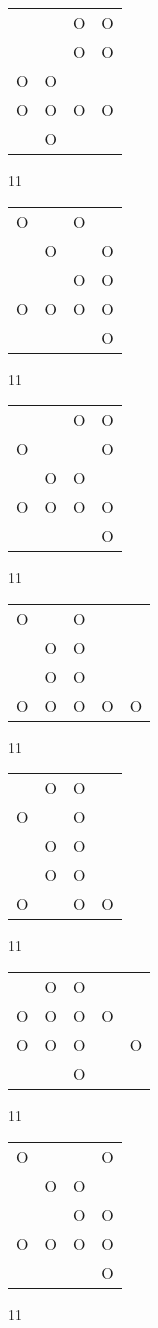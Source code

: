 \begin{tabular}{|m{0.2cm}m{0.2cm}m{0.2cm}m{0.2cm}|}\hline
 & &O&O\\
 & &O&O\\
O&O& & \\
O&O&O&O\\
 &O& & \\
\hline\end{tabular}11
\begin{tabular}{|m{0.2cm}m{0.2cm}m{0.2cm}m{0.2cm}|}\hline
O& &O& \\
 &O& &O\\
 & &O&O\\
O&O&O&O\\
 & & &O\\
\hline\end{tabular}11
\begin{tabular}{|m{0.2cm}m{0.2cm}m{0.2cm}m{0.2cm}|}\hline
 & &O&O\\
O& & &O\\
 &O&O& \\
O&O&O&O\\
 & & &O\\
\hline\end{tabular}11
\begin{tabular}{|m{0.2cm}m{0.2cm}m{0.2cm}m{0.2cm}m{0.2cm}|}\hline
O& &O& & \\
 &O&O& & \\
 &O&O& & \\
O&O&O&O&O\\
\hline\end{tabular}11
\begin{tabular}{|m{0.2cm}m{0.2cm}m{0.2cm}m{0.2cm}|}\hline
 &O&O& \\
O& &O& \\
 &O&O& \\
 &O&O& \\
O& &O&O\\
\hline\end{tabular}11
\begin{tabular}{|m{0.2cm}m{0.2cm}m{0.2cm}m{0.2cm}m{0.2cm}|}\hline
 &O&O& & \\
O&O&O&O& \\
O&O&O& &O\\
 & &O& & \\
\hline\end{tabular}11
\begin{tabular}{|m{0.2cm}m{0.2cm}m{0.2cm}m{0.2cm}|}\hline
O& & &O\\
 &O&O& \\
 & &O&O\\
O&O&O&O\\
 & & &O\\
\hline\end{tabular}11
